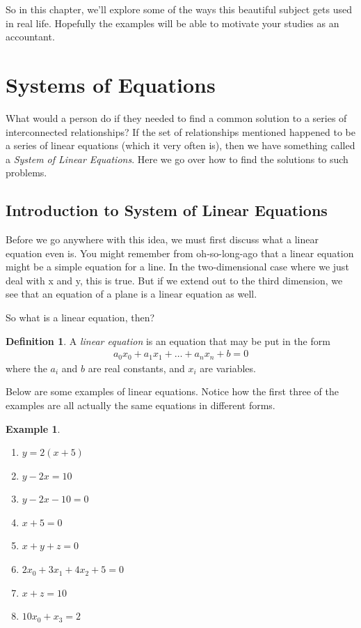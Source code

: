 \documentclass{scrbook}
\theoremstyle{definition}
\newtheorem{definition}{Definition}[section]
\newtheorem{example}{Example}
\begin{document}
So in this chapter, we'll explore some of the ways this beautiful subject gets used in real life. Hopefully the examples will be able to motivate your studies as an accountant.

\section{Systems of Equations}

What would a person do if they needed to find a common solution to a series of interconnected relationships? If the set of relationships mentioned happened to be a series of linear equations (which it very often is), then we have something called a \textit{System of Linear Equations}. Here we go over how to find the solutions to such problems. 

\subsection{Introduction to System of Linear Equations}

Before we go anywhere with this idea, we must first discuss what a linear equation even is. You might remember from oh-so-long-ago that a linear equation might be a simple equation for a line. In the two-dimensional case where we just deal with x and y, this is true. But if we extend out to the third dimension, we see that an equation of a plane is a linear equation as well.

So what is a linear equation, then?

\begin{definition}
  A \textit{linear equation} is an equation that may be put in the form 
  \begin{align*}
    a_0x_0 + a_1x_1 + \dots + a_nx_n + b = 0
  \end{align*}
  where the $a_i$ and $b$ are real constants, and $x_i$ are variables.
\end{definition}

Below are some examples of linear equations. Notice how the first three of the examples are all actually the same equations in different forms.

\begin{example}
  \begin{enumerate}
    \item $y = 2(x + 5)$
    \item $y - 2x = 10$
    \item $y -2x -10 = 0$
    \item $x + 5 = 0$
    \item $x + y + z = 0$
    \item $2x_0 + 3x_1 + 4x_2 + 5 = 0$
    \item $x + z = 10$
    \item $10x_0 + x_3 = 2$
  \end{enumerate}
\end{example}
\end{document}
